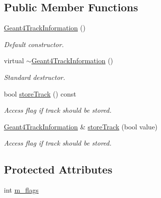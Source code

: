 \subsection*{Public Member Functions}
\begin{DoxyCompactItemize}
\item 
\hyperlink{class_d_d4hep_1_1_simulation_1_1_geant4_track_information_af654942e019813e21dd67c40cb964067}{Geant4TrackInformation} ()
\begin{DoxyCompactList}\small\item\em Default constructor. \item\end{DoxyCompactList}\item 
virtual \hyperlink{class_d_d4hep_1_1_simulation_1_1_geant4_track_information_a6867e8c464d4584ce8c3bb7f4041b504}{$\sim$Geant4TrackInformation} ()
\begin{DoxyCompactList}\small\item\em Standard destructor. \item\end{DoxyCompactList}\item 
bool \hyperlink{class_d_d4hep_1_1_simulation_1_1_geant4_track_information_ab9e5fef91e20017e4e245f1c7c4f37cd}{storeTrack} () const 
\begin{DoxyCompactList}\small\item\em Access flag if track should be stored. \item\end{DoxyCompactList}\item 
\hyperlink{class_d_d4hep_1_1_simulation_1_1_geant4_track_information}{Geant4TrackInformation} \& \hyperlink{class_d_d4hep_1_1_simulation_1_1_geant4_track_information_a91857ec9a2cddd66aeac8e5de17cbe4a}{storeTrack} (bool value)
\begin{DoxyCompactList}\small\item\em Access flag if track should be stored. \item\end{DoxyCompactList}\end{DoxyCompactItemize}
\subsection*{Protected Attributes}
\begin{DoxyCompactItemize}
\item 
int \hyperlink{class_d_d4hep_1_1_simulation_1_1_geant4_track_information_ad1b4800b1848a07c234c8b6657a6c4f3}{m\_\-flags}
\end{DoxyCompactItemize}



